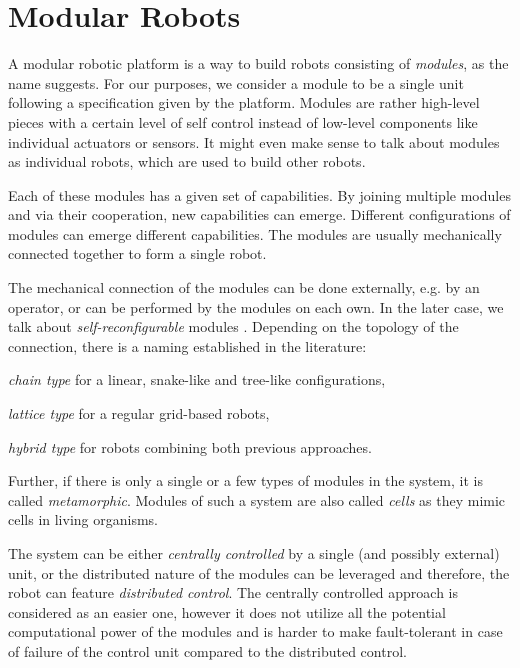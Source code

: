 \section{Modular Robots}

A modular robotic platform is a way to build robots consisting of
\emph{modules}, as the name suggests. For our purposes, we consider a module to
be a single unit following a specification given by the platform. Modules are
rather high-level pieces with a certain level of self control instead of
low-level components like individual actuators or sensors. It might even make
sense to talk about modules as individual robots, which are used to build other
robots\cite{brunete_current_2017}.

Each of these modules has a given set of capabilities. By joining multiple
modules and via their cooperation, new capabilities can emerge. Different
configurations of modules can emerge different capabilities. The modules are
usually mechanically connected together to form a single robot.

The mechanical connection of the modules can be done externally, e.g. by an
operator, or can be performed by the modules on each own. In the later case, we
talk about \emph{self-reconfigurable} modules \cite{brunete_current_2017}.
Depending on the topology of the connection, there is a naming established in
the literature\cite{brunete_current_2017}:
\begin{enumerate*}
    \item \emph{chain type} for a linear, snake-like and tree-like
    configurations,
    \item \emph{lattice type} for a regular grid-based robots,
    \item \emph{hybrid type} for robots combining both previous approaches.
\end{enumerate*}
Further, if there is only a single or a few types of modules in the system, it
is called \emph{metamorphic}\cite{brunete_current_2017}. Modules of such a
system are also called \emph{cells} as they mimic cells in living organisms.

The system can be either \emph{centrally controlled} by a single (and possibly
external) unit, or the distributed nature of the modules can be leveraged and
therefore, the robot can feature \emph{distributed control}. The centrally
controlled approach is considered as an easier one, however it does not utilize
all the potential computational power of the modules and is harder to make
fault-tolerant in case of failure of the control unit compared to the
distributed control.


